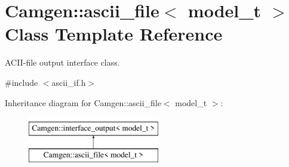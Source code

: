 \hypertarget{a00017}{\section{Camgen\-:\-:ascii\-\_\-file$<$ model\-\_\-t $>$ Class Template Reference}
\label{a00017}
}


A\-C\-I\-I-\/file output interface class.  




{\ttfamily \#include $<$ascii\-\_\-if.\-h$>$}

Inheritance diagram for Camgen\-:\-:ascii\-\_\-file$<$ model\-\_\-t $>$\-:\begin{figure}[H]
\begin{center}
\leavevmode
\includegraphics[height=2.000000cm]{a00017}
\end{center}
\end{figure}
